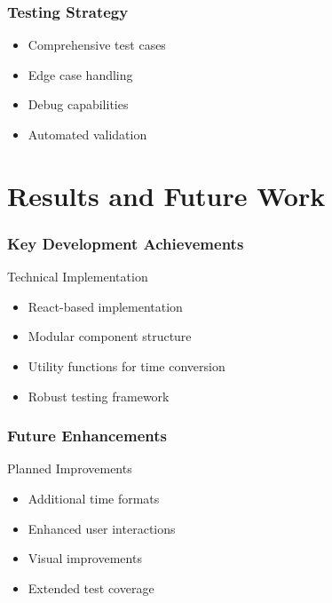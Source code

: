 \documentclass{beamer}
\begin{document}
\begin{frame}[t]
    \frametitle{Testing Strategy}
    \begin{itemize}
        \item Comprehensive test cases \pause
        \item Edge case handling \pause
        \item Debug capabilities \pause
        \item Automated validation
    \end{itemize}
\end{frame}

\section{Results and Future Work}
\begin{frame}
    \frametitle{Key Development Achievements}
    \begin{exampleblock}{Technical Implementation}
        \begin{itemize}
            \item React-based implementation
            \item Modular component structure
            \item Utility functions for time conversion
            \item Robust testing framework
        \end{itemize}
    \end{exampleblock}
\end{frame}

\begin{frame}[t]
    \frametitle{Future Enhancements}
    \begin{block}{Planned Improvements}
    \begin{itemize}
        \item Additional time formats \pause
        \item Enhanced user interactions \pause
        \item Visual improvements \pause
        \item Extended test coverage
    \end{itemize}
    \end{block}
\end{frame}
\end{document}
